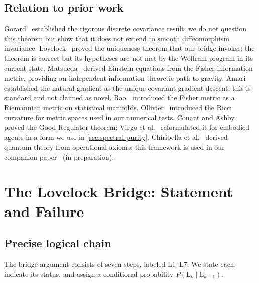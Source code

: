 \documentclass[11pt]{article}
\theoremstyle{definition}
\theoremstyle{remark}
\begin{document}
\subsection{Relation to prior work}
\label{sec:prior-work}

Gorard~\cite{Gorard2020} established the rigorous discrete covariance
result; we do not question this theorem but show that it does not extend
to smooth diffeomorphism invariance.
Lovelock~\cite{Lovelock1971} proved the uniqueness theorem that our
bridge invokes; the theorem is correct but its hypotheses are not met by
the Wolfram program in its current state.
Matsueda~\cite{Matsueda2013} derived Einstein equations from the Fisher
information metric, providing an independent information-theoretic path
to gravity.
Amari~\cite{Amari1998} established the natural gradient as the unique
covariant gradient descent; this is standard and not claimed as novel.
Rao~\cite{Rao1945} introduced the Fisher metric as a Riemannian metric
on statistical manifolds.
Ollivier~\cite{Ollivier2009} introduced the Ricci curvature for metric
spaces used in our numerical tests.
Conant and Ashby~\cite{ConantAshby1970} proved the Good Regulator
theorem; Virgo et al.~\cite{Virgo2025} reformulated it for embodied
agents in a form we use in \cref{sec:spectral-purity}.
Chiribella et al.~\cite{Chiribella2011} derived quantum theory from
operational axioms; this framework is used in our companion
paper~\cite{companion_qm} (in preparation).

\section{The Lovelock Bridge: Statement and Failure}
\label{sec:failure}

\subsection{Precise logical chain}
\label{sec:logical-chain}

The bridge argument consists of seven steps, labeled L1--L7.
We state each, indicate its status, and assign a conditional probability
$P(\text{L}_{k} \mid \text{L}_{k-1})$.
\end{document}
